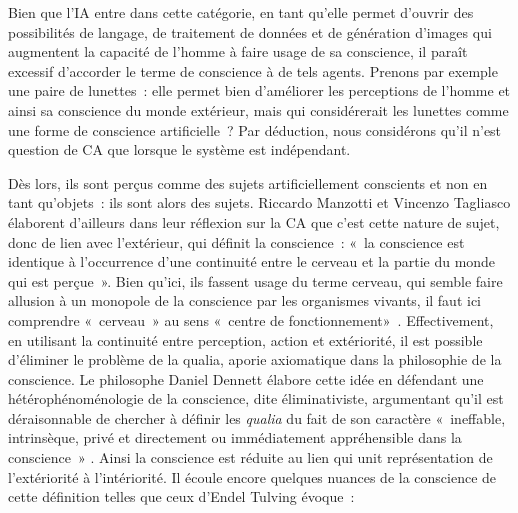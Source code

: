 \documentclass[a4paper, titlepage, 12pt]{article}
\begin{document}
	Bien que l’IA entre dans cette catégorie, en tant qu’elle permet d’ouvrir des possibilités de langage, de traitement de données et de génération d’images qui augmentent la capacité de l’homme à faire usage de sa conscience, il paraît excessif d’accorder le terme de conscience à de tels agents. Prenons par exemple une paire de lunettes~: elle permet bien d'améliorer les perceptions de l’homme et ainsi sa conscience du monde extérieur, mais qui considérerait les lunettes comme une forme de conscience artificielle~? Par déduction, nous considérons qu’il n’est question de CA que lorsque le système est indépendant.

	Dès lors, ils sont perçus comme des sujets artificiellement conscients et non en tant qu’objets~: ils sont alors des sujets. Riccardo Manzotti et Vincenzo Tagliasco élaborent d’ailleurs dans leur réflexion sur la CA que c’est cette nature de sujet, donc de lien avec l'extérieur, qui définit la conscience~: «~la conscience est identique à l'occurrence d’une continuité entre le cerveau et la partie du monde qui est perçue~». Bien qu’ici, ils fassent usage du terme cerveau, qui semble faire allusion à un monopole de la conscience par les organismes vivants, il faut ici  comprendre «~cerveau~» au sens «~centre de fonctionnement»~. Effectivement, en utilisant la continuité entre perception, action et extériorité, il est possible d’éliminer le problème de la qualia, aporie axiomatique dans la philosophie de la conscience. Le philosophe Daniel Dennett élabore cette idée en défendant une hétérophénoménologie de la conscience, dite éliminativiste, argumentant qu’il est déraisonnable de chercher à définir les \textit{qualia} du fait de son caractère «~ineffable, intrinsèque, privé et directement ou immédiatement appréhensible dans la conscience~» \cite{dennettConsciousnessExplained1993}. Ainsi la conscience est réduite au lien qui unit représentation de l’extériorité à l'intériorité. Il écoule encore quelques nuances de la conscience de cette définition telles que ceux d’Endel Tulving évoque~: \cite{tulvingEpisodicMemoryAutonoesis2005}
\end{document}
